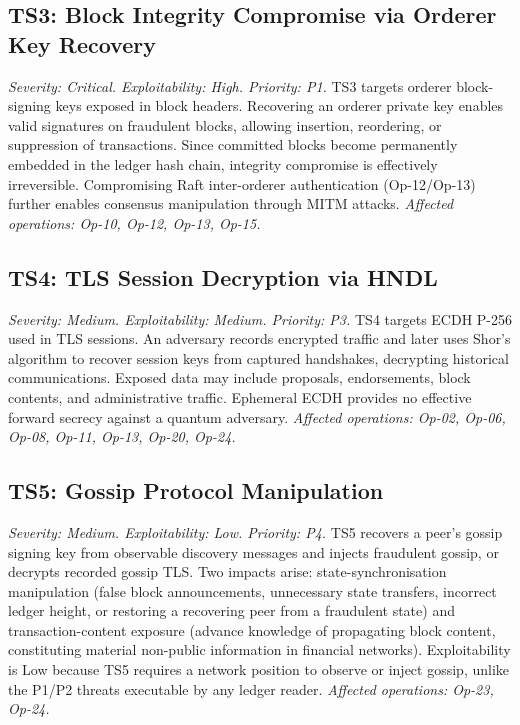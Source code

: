\documentclass[conference]{IEEEtran}
\begin{document}
\subsection{TS3: Block Integrity Compromise via Orderer Key Recovery}
\textit{Severity: Critical. Exploitability: High. Priority: P1.}
TS3 targets orderer block-signing keys exposed in block headers. Recovering an orderer private key enables valid signatures on fraudulent blocks, allowing insertion, reordering, or suppression of transactions. Since committed blocks become permanently embedded in the ledger hash chain, integrity compromise is effectively irreversible. Compromising Raft inter-orderer authentication (Op-12/Op-13) further enables consensus manipulation through MITM attacks. \emph{Affected operations: Op-10, Op-12, Op-13, Op-15.}

\subsection{TS4: TLS Session Decryption via HNDL}
\textit{Severity: Medium. Exploitability: Medium. Priority: P3.}
TS4 targets ECDH P-256 used in TLS sessions. An adversary records encrypted traffic and later uses Shor's algorithm to recover session keys from captured handshakes, decrypting historical communications. Exposed data may include proposals, endorsements, block contents, and administrative traffic. Ephemeral ECDH provides no effective forward secrecy against a quantum adversary. \emph{Affected operations: Op-02, Op-06, Op-08, Op-11, Op-13, Op-20, Op-24.}


\subsection{TS5: Gossip Protocol Manipulation}
\textit{Severity: Medium. Exploitability: Low. Priority: P4.}
TS5 recovers a peer's gossip signing key from observable discovery messages and
injects fraudulent gossip, or decrypts recorded gossip TLS. Two impacts arise:
state-synchronisation manipulation (false block announcements, unnecessary state
transfers, incorrect ledger height, or restoring a recovering peer from a
fraudulent state) and transaction-content exposure (advance knowledge of
propagating block content, constituting material non-public information in
financial networks). Exploitability is Low because TS5 requires a network
position to observe or inject gossip, unlike the P1/P2 threats executable by any
ledger reader. \emph{Affected operations: Op-23, Op-24.}
\end{document}
